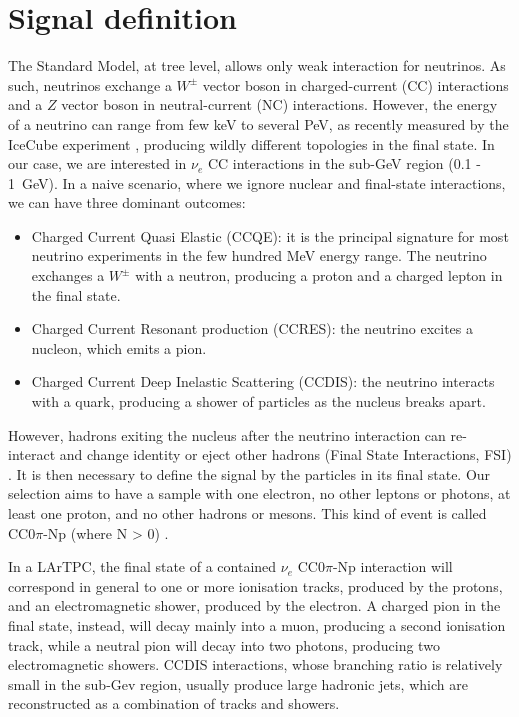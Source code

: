 
\section{Signal definition}
The Standard Model, at tree level, allows only weak interaction for neutrinos. As such, neutrinos exchange a $W^{\pm}$ vector boson in charged-current (CC) interactions and a $Z$ vector boson in neutral-current (NC) interactions. 
However, the energy of a neutrino can range from few keV to several PeV, as recently measured by the IceCube experiment \cite{icecube}, producing wildly different topologies in the final state. 
In our case, we are interested in $\nu_{e}$ CC interactions in the sub-GeV region (0.1 - 1~GeV). In a naive scenario, where we ignore nuclear and final-state interactions, we can have three dominant outcomes:
\begin{itemize}
\item Charged Current Quasi Elastic (CCQE): it is the principal signature for most neutrino experiments in the few hundred MeV energy range. The neutrino exchanges a $W^{\pm}$ with a neutron, producing a proton and a charged lepton in the final state.
\item Charged Current Resonant production (CCRES): the neutrino excites a nucleon, which emits a pion.
\item Charged Current Deep Inelastic Scattering (CCDIS): the neutrino interacts with a quark, producing a shower of particles as the nucleus breaks apart.
\end{itemize}

However, hadrons exiting the nucleus after the neutrino interaction can re-interact and change identity or eject other hadrons (Final State Interactions, FSI) \cite{ccqe2}. It is then necessary to define the signal by the particles in its final state. Our selection aims to have a sample with one electron, no other leptons or photons, at least one proton, and no other hadrons or mesons. This kind of event is called CC0$\pi$-Np (where N > 0) \cite{teppei}.

In a LArTPC, the final state of a contained $\nu_{e}$ CC0$\pi$-Np interaction will correspond in general to one or more ionisation tracks, produced by the protons, and an electromagnetic shower, produced by the electron. A charged pion in the final state, instead, will decay mainly into a muon, producing a second ionisation track, while a neutral pion will decay into two photons, producing two electromagnetic showers. 
CCDIS interactions, whose branching ratio is relatively small in the sub-Gev region, usually produce large hadronic jets, which are reconstructed as a combination of tracks and showers. 

